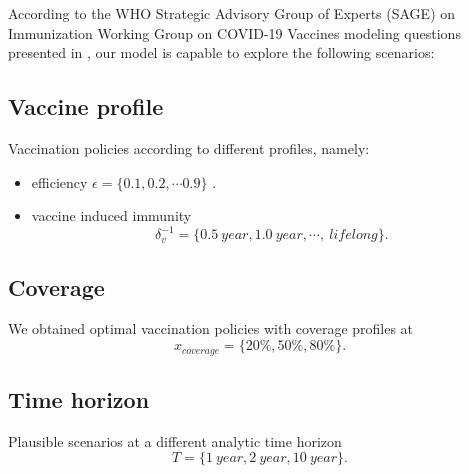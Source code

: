 According to the WHO Strategic Advisory Group of Experts (SAGE) on 
Immunization Working Group on COVID-19 Vaccines modeling questions 
presented in \cite{sage2020}, our model is capable to explore the following scenarios:
    \subsection*{Vaccine profile}
    Vaccination policies according to different profiles, namely:
    \begin{itemize}
      \item
          efficiency
          $\epsilon = \{\num{0.1}, \num{0.2}, \cdots  \num{0.9} \}$ .
      \item
        vaccine induced immunity
        $$
          \delta_v ^{-1}=
            \{\SI{0.5}{year},
              \SI{1.0}{year}, \cdots, \SI{}{lifelong}
            \}.
        $$
    \end{itemize}


  \subsection*{Coverage}
    We obtained optimal vaccination policies with coverage profiles at
    $$
      x_{coverage} =
        \{
          20\%, 50\%, 80\%
        \}.
    $$
  \subsection*{Time horizon}
  Plausible scenarios at a different analytic time horizon
  $$
    T= \{ \SI{1}{year}, \SI{2}{year}, \SI{10}{year} \}.
  $$
  
